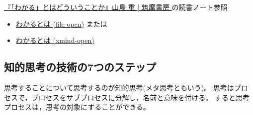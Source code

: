 \documentclass[dvipdfmx,11pat]{jarticle}
\begin{document}
\href{https://www.chikumashobo.co.jp/product/9784480059390/}{『「わかる」とはどういうことか』山鳥 重 | 筑摩書房 }
の読書ノート参照
\begin{itemize}
\item \href{../Maps/わかるとは.xmind}{わかるとは (file-open)} または
\item \href{shell:xmind ../Maps/わかるとは.xmind}{わかるとは (xmind-open)}
\end{itemize}
\subsection{知的思考の技術の7つのステップ}
\label{sec:org5b7c3db}

思考することについて思考するのが知的思考(メタ思考ともいう)。
思考はプロセスで，プロセスをサブプロセスに分解し，名前と意味を付ける。
すると思考プロセスは，思考の対象にすることができる。
\end{document}
